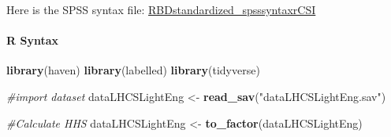 \documentclass[
]{article}
\newenvironment{Shaded}{\begin{snugshade}}{\end{snugshade}}
\newcommand{\CommentTok}[1]{\textcolor[rgb]{0.56,0.35,0.01}{\textit{#1}}}
\newcommand{\KeywordTok}[1]{\textcolor[rgb]{0.13,0.29,0.53}{\textbf{#1}}}
\newcommand{\NormalTok}[1]{#1}
\newcommand{\StringTok}[1]{\textcolor[rgb]{0.31,0.60,0.02}{#1}}
\begin{document}
Here is the SPSS syntax file:
\href{https://www.dropbox.com/s/gsj4tvadww9v3q4/RBDstandardized_questionnairerCSI.xlsx?dl=0}{RBDstandardized\_spsssyntaxrCSI}

\hypertarget{r-syntax-2}{%
\paragraph{R Syntax}\label{r-syntax-2}}

\begin{Shaded}
\begin{Highlighting}[]
\KeywordTok{library}\NormalTok{(haven)}
\KeywordTok{library}\NormalTok{(labelled)}
\KeywordTok{library}\NormalTok{(tidyverse)}

\CommentTok{#import dataset}
\NormalTok{dataLHCSLightEng <-}\StringTok{ }\KeywordTok{read_sav}\NormalTok{(}\StringTok{"dataLHCSLightEng.sav"}\NormalTok{)}

\CommentTok{#Calculate HHS }
\NormalTok{dataLHCSLightEng <-}\StringTok{ }\KeywordTok{to_factor}\NormalTok{(dataLHCSLightEng)}


\end{Highlighting}
\end{Shaded}
\end{document}
